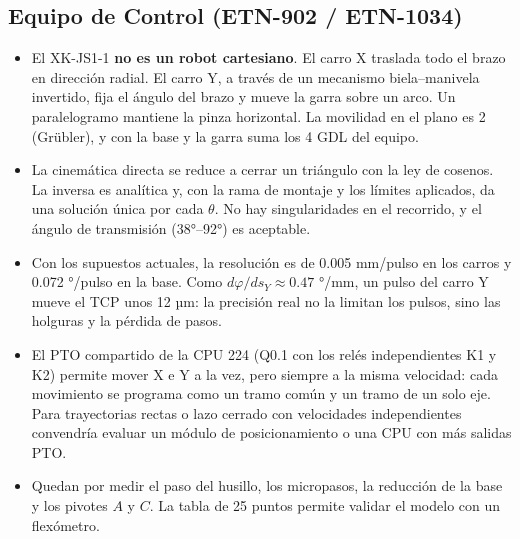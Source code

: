 \documentclass[a4paper,12pt]{article}
\begin{document}
\subsection{Equipo de Control (ETN-902 / ETN-1034)}
\begin{itemize}
\item El XK-JS1-1 \textbf{no es un robot cartesiano}. El carro X traslada todo el brazo en dirección radial.
      El carro Y, a través de un mecanismo biela--manivela invertido, fija el ángulo del brazo y mueve la
      garra sobre un arco. Un paralelogramo mantiene la pinza horizontal. La movilidad en el plano es 2
      (Grübler), y con la base y la garra suma los 4 GDL del equipo.
\item La cinemática directa se reduce a cerrar un triángulo con la ley de cosenos. La inversa es analítica
      y, con la rama de montaje y los límites aplicados, da una solución única por cada $\theta$. No hay
      singularidades en el recorrido, y el ángulo de transmisión (38°--92°) es aceptable.
\item Con los supuestos actuales, la resolución es de 0.005 mm/pulso en los carros y 0.072 °/pulso en la
      base. Como $d\varphi/ds_Y \approx 0.47$ °/mm, un pulso del carro Y mueve el TCP unos 12 µm: la
      precisión real no la limitan los pulsos, sino las holguras y la pérdida de pasos.
\item El PTO compartido de la CPU 224 (Q0.1 con los relés independientes K1 y K2) permite mover X e Y a la
      vez, pero siempre a la misma velocidad: cada movimiento se programa como un tramo común y un tramo
      de un solo eje. Para trayectorias rectas o lazo cerrado con velocidades independientes convendría
      evaluar un módulo de posicionamiento o una CPU con más salidas PTO.
\item Quedan por medir el paso del husillo, los micropasos, la reducción de la base y los pivotes $A$ y
      $C$. La tabla de 25 puntos permite validar el modelo con un flexómetro.
\end{itemize}
\end{document}
